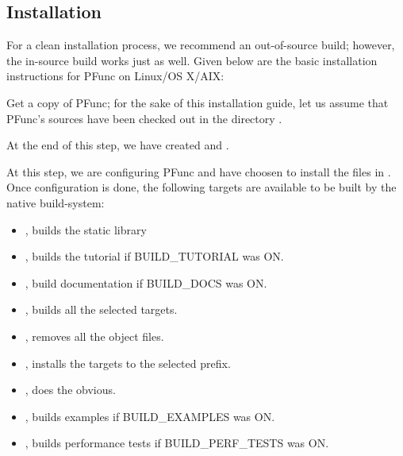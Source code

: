 \subsection{Installation}
For a clean installation process, we recommend an out-of-source build; however,
the in-source build works just as well. 
%
Given below are the basic installation instructions for PFunc on Linux/OS
X/AIX:

\begin{list}{}{\leftmargin=0em}
\item
Get a copy of PFunc; for the sake of this installation guide, let us assume
that PFunc's sources have been checked out in the directory
.

\item
{}

At the end of this step, we have created  and 
.

\item
{}

\item
{}

At this step, we are configuring PFunc and have choosen to install the 
files in . 
%
Once configuration is done, the following targets are available to be built by
the native build-system: 
  \begin{itemize}
  \item {}, builds the static library 
  \item {}, builds the tutorial if BUILD\_TUTORIAL was ON.
  \item {}, build documentation if BUILD\_DOCS was ON.
  \item {},  builds all the selected targets.
  \item {}, removes all the object files.
  \item {}, installs the targets to the selected prefix.
  \item {}, does the obvious.
  \item {}, builds examples if BUILD\_EXAMPLES was ON.
  \item {}, builds performance tests if BUILD\_PERF\_TESTS was ON.
  \end{itemize}
\end{list}

